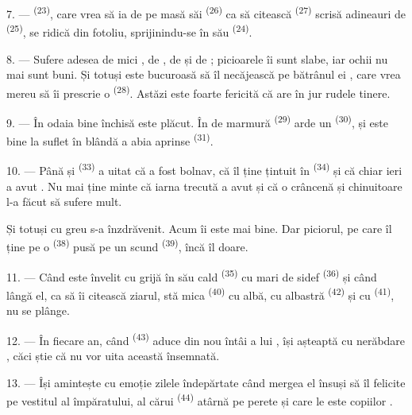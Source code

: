 7. ---  \textsuperscript{(23)}, care vrea să ia de pe masă
 săi \textsuperscript{(26)} ca să citească 
\textsuperscript{(27)} scrisă adineauri de 
\textsuperscript{(25)}, se ridică din fotoliu, sprijinindu-se în 
său \textsuperscript{(24)}.

8. --- Sufere adesea de mici , de , de
 și de ; picioarele îi sunt slabe, iar
ochii nu mai sunt buni. Și totuși este bucuroasă să îl necăjească pe bătrânul ei
, care vrea mereu să îi prescrie o 
\textsuperscript{(28)}. Astăzi este foarte fericită că are în jur rudele tinere.

9. --- În odaia bine închisă este plăcut. În  de marmură
\textsuperscript{(29)} arde un  \textsuperscript{(30)}, și este
bine la suflet în  blândă a  abia aprinse
\textsuperscript{(31)}.

\VUsaut{4.2mm}
\VUsaut{3.0mm}

10. --- Până și  \textsuperscript{(33)} a uitat că a fost bolnav,
că  îl ține țintuit în 
\textsuperscript{(34)} și că chiar ieri a avut . Nu
mai ține minte că iarna trecută a avut  și că o
 crâncenă și chinuitoare l-a făcut să sufere mult.

Și totuși cu greu s-a înzdrăvenit. Acum îi este mai bine. Dar piciorul, pe care îl
ține pe o  \textsuperscript{(38)} pusă pe un 
scund \textsuperscript{(39)}, încă îl doare.

11. --- Când este învelit cu grijă în  său cald
\textsuperscript{(35)} cu  mari de sidef \textsuperscript{(36)}
și când lângă el, ca să îi citească ziarul, stă mica 
\textsuperscript{(40)} cu  albă, cu  albastră
\textsuperscript{(42)} și cu  \textsuperscript{(41)}, nu se
plânge.

12. --- În fiecare an, când  \textsuperscript{(43)} aduce din
nou  întâi a lui , își așteaptă cu nerăbdare
, căci știe că nu vor uita această  însemnată.

13. --- Își amintește cu emoție zilele îndepărtate când mergea el însuși să îl
felicite pe vestitul  al împăratului, al cărui 
\textsuperscript{(44)} atârnă pe perete și care le este copiilor
.
\VUsaut{6.0mm}
\VUfilet{22mm}
